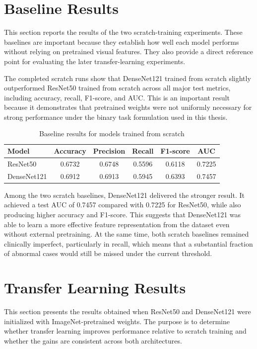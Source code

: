 \section{Baseline Results}
This section reports the results of the two scratch-training experiments. These baselines are important because they establish how well each model performs without relying on pretrained visual features. They also provide a direct reference point for evaluating the later transfer-learning experiments.

The completed scratch runs show that DenseNet121 trained from scratch slightly outperformed ResNet50 trained from scratch across all major test metrics, including accuracy, recall, F1-score, and AUC. This is an important result because it demonstrates that pretrained weights were not uniformly necessary for strong performance under the binary task formulation used in this thesis.

\begin{table}[htbp]
    \centering
    \caption{Baseline results for models trained from scratch}
    \label{tab:baseline-results}
    \begin{tabular}{lccccc}
        \toprule
        Model & Accuracy & Precision & Recall & F1-score & AUC \\
        \midrule
        ResNet50 & 0.6732 & 0.6748 & 0.5596 & 0.6118 & 0.7225 \\
        DenseNet121 & 0.6912 & 0.6913 & 0.5945 & 0.6393 & 0.7457 \\
        \bottomrule
    \end{tabular}
\end{table}

Among the two scratch baselines, DenseNet121 delivered the stronger result. It achieved a test AUC of 0.7457 compared with 0.7225 for ResNet50, while also producing higher accuracy and F1-score. This suggests that DenseNet121 was able to learn a more effective feature representation from the dataset even without external pretraining. At the same time, both scratch baselines remained clinically imperfect, particularly in recall, which means that a substantial fraction of abnormal cases would still be missed under the current threshold.

\section{Transfer Learning Results}
This section presents the results obtained when ResNet50 and DenseNet121 were initialized with ImageNet-pretrained weights. The purpose is to determine whether transfer learning improves performance relative to scratch training and whether the gains are consistent across both architectures.

